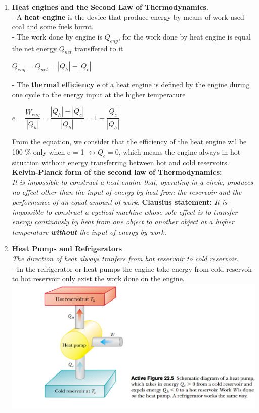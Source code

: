 \documentclass[10pt]{article}
\begin{document}
\begin{enumerate}
	\item \textbf{Heat engines and the Second Law of Thermodynamics}.\\
	- A \textbf{heat engine} is the device that produce energy by means of work used coal and some fuels burnt.\\
	- The work done by engine is $Q_{eng}$, for the work done by heat engine is equal the net energy $Q_{net}$ transffered to it.
	\begin{mybox}
	\begin{center}
	$Q_{eng} = Q_{net} = |Q_h| - |Q_c|$
	\end{center}
	\end{mybox}
	- The \textbf{thermal efficiency} e of a heat engine is defined by the engine during one cycle to the energy input at the higher temperature
	\begin{mybox}
	\begin{center}
	$e = \dfrac{W_{eng}}{|Q_h|} = \dfrac{|Q_h| - |Q_c|}{|Q_h|} = 1 - \dfrac{|Q_c|}{|Q_h|}$
	\end{center}
	\end{mybox}
	From the equation, we consider that the efficiency of the heat engine wil be 100 \% only when e = 1 $\leftrightarrow{Q_c = 0}$, which means the engine always in hot situation without energy transferring between hot and cold reservoirs.\\
	\textbf{Kelvin-Planck form of the second law of Thermodynamics:}\\
	     \textit{It is impossible to construct a heat engine that, operating in a circle, produces no effect other than the input of energy by heat from the reservoir and the performance of an equal amount of work.}
	\textbf{Clausius statement:}
	     \textit{It is impossible to construct a cyclical machine whose sole effect is to transfer energy continously by heat from one object to another object at a higher temperature \textbf{without} the input of energy by work.}      
	\item \textbf{Heat Pumps and Refrigerators}\\
	\textit{The direction of heat always tranfers from hot reservoir to cold reservoir}.\\
	- In the refrigerator or heat pumps the engine take energy from cold reservoir to hot reservoir only exist the work done on the engine.\\
	\includegraphics{hinh3}

\end{enumerate}
\end{document}
